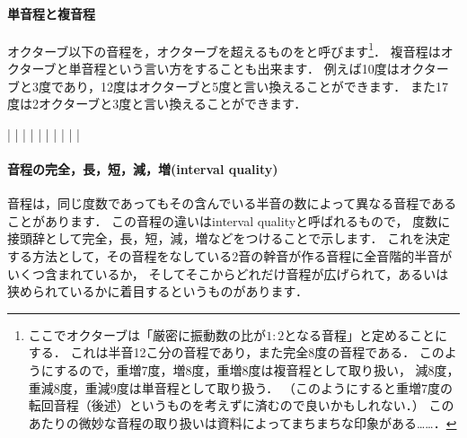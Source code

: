 \documentclass[dvipdfmx,uplatex,b5paper,openany,jbase=12Q,nomag*,textwidth-limit=44%
               ]{gachimuchi}
\begin{document}
\paragraph{単音程と複音程}
オクターブ以下の音程を，オクターブを超えるものをと呼びます\footnote{%
  ここでオクターブは「厳密に振動数の比が$1:2$となる音程」と定めることにする．
  これは半音12こ分の音程であり，また完全8度の音程である．
  このようにするので，重増7度，増8度，重増8度は複音程として取り扱い，
  減8度，重減8度，重減9度は単音程として取り扱う．
  （このようにすると重増7度の転回音程（後述）というものを考えずに済むので良いかもしれない．）
  このあたりの微妙な音程の取り扱いは資料によってまちまちな印象がある……．
}．
複音程はオクターブと単音程という言い方をすることも出来ます．
例えば10度はオクターブと3度であり，12度はオクターブと5度と言い換えることができます．
また17度は2オクターブと3度と言い換えることができます．
\begin{Music}
  \Startpiece%
  \Notes|%
  \tinynotesize
  \en\NOtes
  |%
  \en\bar%
  \znotes|\en%
  \Notes%
  \tinynotesize
  \en\Notes%
  \tinynotesize
  |\tinynotesize
  \en\NOtes
  |%
  \en\bar%
  \znotes|\en%
  \Notes%
  \tinynotesize
  \en\Notes%
  \tinynotesize
  |\tinynotesize
  \en\NOtes
  |%
  \en%
  \endpiece%
\end{Music}


\paragraph{音程の完全，長，短，減，増(interval quality)}
音程は，同じ度数であってもその含んでいる半音の数によって異なる音程であることがあります．
この音程の違いはinterval qualityと呼ばれるもので，
度数に接頭辞として完全，長，短，減，増などをつけることで示します．
これを決定する方法として，その音程をなしている2音の幹音が作る音程に全音階的半音がいくつ含まれているか，
そしてそこからどれだけ音程が広げられて，あるいは狭められているかに着目するというものがあります．
\end{document}
